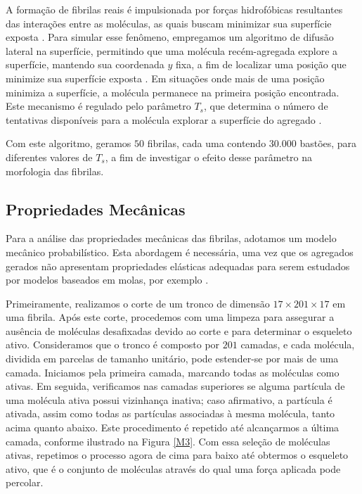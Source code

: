 \documentclass{article}
\begin{document}
        A formação de fibrilas reais é impulsionada por forças hidrofóbicas resultantes das interações entre as moléculas, as quais buscam 
        minimizar sua superfície exposta \cite{Kadler1987,Parkinson1995}. Para simular esse fenômeno, empregamos um algoritmo de difusão lateral
        na superfície, permitindo que uma molécula recém-agregada explore a superfície, mantendo sua coordenada \(y\) fixa, a fim de localizar 
        uma posição que minimize sua superfície exposta \cite{GarcaRuiz1991}. Em situações onde mais de uma posição minimiza a superfície, a 
        molécula permanece na primeira posição encontrada. Este mecanismo é regulado pelo parâmetro \(T_{s}\), que determina o número de 
        tentativas disponíveis para a molécula explorar a superfície do agregado \cite{Parkinson1995}.

        Com este algoritmo, geramos \(50\) fibrilas, cada uma contendo \(30.000\) bastões, para diferentes valores de \(T_{s}\), a fim de 
        investigar o efeito desse parâmetro na morfologia das fibrilas. 


    \subsection{Propriedades Mecânicas} 

        Para a análise das propriedades mecânicas das fibrilas, adotamos um modelo mecânico probabilístico. Esta abordagem é necessária, uma vez
        que os agregados gerados não apresentam propriedades elásticas adequadas para serem estudados por modelos baseados em molas, por exemplo
        \cite{Parkinson1997,Saitoh2020MolecularDS}.

        Primeiramente, realizamos o corte de um tronco de dimensão \(17 \times 201 \times 17\) em uma fibrila. Após este corte, procedemos com 
        uma limpeza para assegurar a ausência de moléculas desafixadas devido ao corte e para determinar o esqueleto ativo. Consideramos que o 
        tronco é composto por \(201\) camadas, e cada molécula, dividida em parcelas de tamanho unitário, pode estender-se por mais de uma camada.
        Iniciamos pela primeira camada, marcando todas as moléculas como ativas. Em seguida, verificamos nas camadas superiores se alguma 
        partícula de uma molécula ativa possui vizinhança inativa; caso afirmativo, a partícula é ativada, assim como todas as partículas 
        associadas à mesma molécula, tanto acima quanto abaixo. Este procedimento é repetido até alcançarmos a última camada, conforme ilustrado 
        na Figura \ref{M3}. Com essa seleção de moléculas ativas, repetimos o processo agora de cima para baixo até obtermos o esqueleto ativo, 
        que é o conjunto de moléculas através do qual uma força aplicada pode percolar. 
\end{document}
